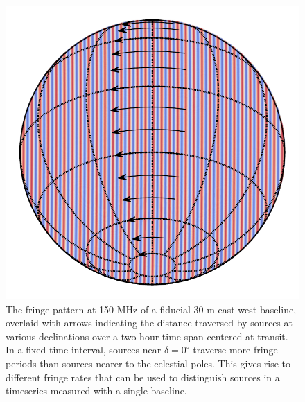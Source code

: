 \documentclass[twocolumn,apj,numberedappendix]{emulateapj}
\begin{document}
\begin{figure}\centering
\includegraphics[width=.9\columnwidth]{plots/ew_fringe}
\caption{
The fringe pattern at 150 MHz of a fiducial 30-m east-west baseline, overlaid with arrows indicating
the distance traversed by sources at various declinations over a two-hour time span centered at transit.
In a fixed time interval, sources near $\delta=0^\circ$ traverse more 
fringe periods than sources nearer to the celestial poles. This gives rise to different
fringe rates that can be used to distinguish sources in a timeseries measured with a single baseline.
}\label{fig:ew_fringe}
\end{figure}
\end{document}
